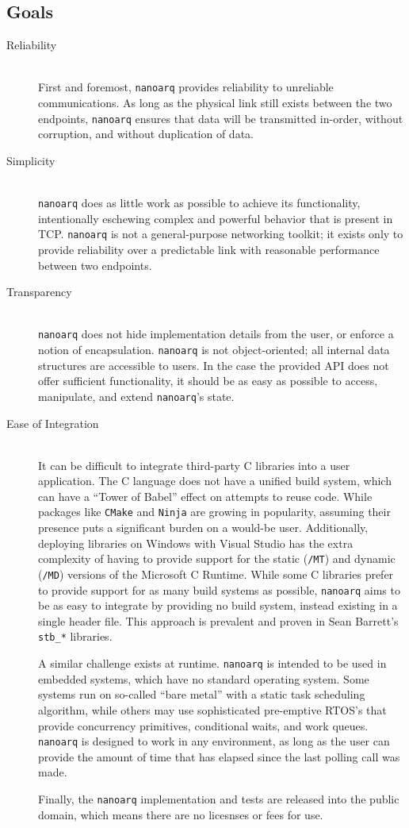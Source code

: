 \documentclass[11pt]{article}
\newcommand{\nanoarq}{\texttt{nanoarq}}
\begin{document}
\subsection{Goals}
\begin{description}
\item[Reliability] \hfill \\
First and foremost, \nanoarq{} provides reliability to unreliable communications. As long as the physical link still exists between the two endpoints, \nanoarq{} ensures that data will be transmitted in-order, without corruption, and without duplication of data.
\item[Simplicity] \hfill \\
\nanoarq{} does as little work as possible to achieve its functionality, intentionally eschewing complex and powerful behavior that is present in TCP. \nanoarq{} is not a general-purpose networking toolkit; it exists only to provide reliability over a predictable link with reasonable performance between two endpoints.
\item[Transparency] \hfill \\
\nanoarq{} does not hide implementation details from the user, or enforce a notion of encapsulation. \nanoarq{} is not object-oriented; all internal data structures are accessible to users. In the case the provided API does not offer sufficient functionality, it should be as easy as possible to access, manipulate, and extend \nanoarq{}'s state.
\item[Ease of Integration] \hfill \\
It can be difficult to integrate third-party C libraries into a user application. The C language does not have a unified build system, which can have a \enquote{Tower of Babel} effect on attempts to reuse code. While packages like \texttt{CMake} and \texttt{Ninja} are growing in popularity, assuming their presence puts a significant burden on a would-be user. Additionally, deploying libraries on Windows with Visual Studio has the extra complexity of having to provide support for the static (\texttt{/MT}) and dynamic (\texttt{/MD}) versions of the Microsoft C Runtime. While some C libraries prefer to provide support for as many build systems as possible, \nanoarq{} aims to be as easy to integrate by providing no build system, instead existing in a single header file. This approach is prevalent and proven in Sean Barrett's \texttt{stb\_*} libraries. \par
A similar challenge exists at runtime. \nanoarq{} is intended to be used in embedded systems, which have no standard operating system. Some systems run on so-called \enquote{bare metal} with a static task scheduling algorithm, while others may use sophisticated pre-emptive RTOS's that provide concurrency primitives, conditional waits, and work queues. \nanoarq{} is designed to work in any environment, as long as the user can provide the amount of time that has elapsed since the last polling call was made. \par
Finally, the \nanoarq{} implementation and tests are released into the public domain, which means there are no licesnses or fees for use.
\end{description}
\end{document}
